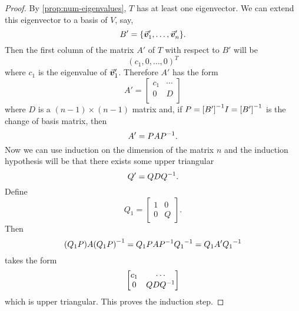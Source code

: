 \documentclass[MathsNotesBase.tex]{subfiles}
\begin{document}
{		\bigskip
		\begin{proof}
			By \autoref{prop:num-eigenvalues}, $T$ has at least one eigenvector. We can extend this eigenvector to a basis of $V$, say,
			\[ B' = \{\vec{\bm{v}}_1',\dots,\vec{\bm{v}}_n'\}. \]
			Then the first column of the matrix $A'$ of $T$ with respect to $B'$ will be
			\[ (c_1,0,\dots,0)^T \]
			where $c_1$ is the eigenvalue of $\vec{\bm{v}}_1'$. Therefore $A'$ has the form
			\[
				A' = \begin{bmatrix}
					c_1 & \cdots \\
					0   &   D \\
					\end{bmatrix} 
			\]
			where $D$ is a ${ (n-1) \times (n-1) }$ matrix and, if ${ P = {[B']}^{-1}I = {[B']}^{-1} }$ is the change of basis matrix, then
			\[ A' = PA{P}^{-1}. \]
			Now we can use induction on the dimension of the matrix $n$ and the induction hypothesis will be that there exists some upper triangular
			\[ Q' = QD{Q}^{-1}. \]
			Define
			\[ Q_1 = \begin{bmatrix}
					1 & 0\\
					0 & Q
					\end{bmatrix}. 
			\]
			Then
			\[ (Q_1P)A{(Q_1P)}^{-1} = Q_1PA{P}^{-1}{Q_1}^{-1} = Q_1A'{Q_1}^{-1} \]
			takes the form
			\[
				\begin{bmatrix}
				c_1 & \cdots\\
				0   & QD{Q}^{-1}
				\end{bmatrix} 
			\]
			which is upper triangular. This proves the induction step.
		\end{proof}
	
		\medskip{}
		
}
\end{document}
